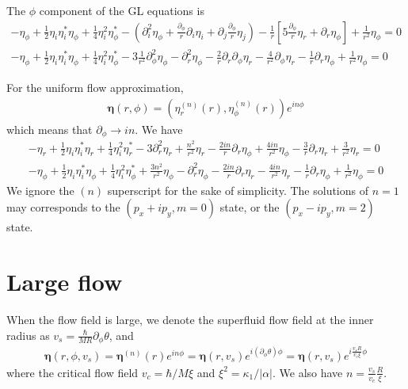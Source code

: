 \documentclass[aps,prl,preprint]{revtex4-2}
\begin{document}
The $\phi$ component of the GL equations is
\begin{align}
    -\eta_\phi+\frac{1}{2}\eta_i\eta_i^*\eta_\phi
    +\frac{1}{4}\eta_i^2\eta_\phi^*
    -\left(\partial_i^2\eta_\phi
    +\frac{\partial_\phi}{r}\partial_i\eta_i
    +\partial_j\frac{\partial_\phi}{r}\eta_j\right)
    -\frac{1}{r}\left[5\frac{\partial_\phi}{r}\eta_r
    +\partial_r\eta_\phi\right]
    +\frac{1}{r^2}\eta_\phi=0\nonumber\\
    -\eta_\phi+\frac{1}{2}\eta_i\eta_i^*\eta_\phi
    +\frac{1}{4}\eta_i^2\eta_\phi^*
    -3\frac{1}{r^2}\partial_\phi^2\eta_\phi
    -\partial_r^2\eta_\phi
    -\frac{2}{r}\partial_r\partial_\phi\eta_r
    -\frac{4}{r^2}\partial_\phi\eta_r
    -\frac{1}{r}\partial_r\eta_\phi
    +\frac{1}{r^2}\eta_\phi=0\nonumber
\end{align}

For the uniform flow approximation,
\begin{align}
    \bm{\eta}(r, \phi) = \left(\eta_r^{(n)}(r), \eta_\phi^{(n)}(r)\right) e^{in\phi}
\end{align}
which means that $\partial_\phi \rightarrow in$. We have
\begin{align}
    -\eta_r+\frac{1}{2}\eta_i\eta_i^*\eta_r
    +\frac{1}{4}\eta_i^2\eta_r^*
    -3\partial_r^2\eta_r + \frac{n^2}{r^2}\eta_r
    -\frac{2in}{r}\partial_r\eta_\phi
    +\frac{4in}{r^2}\eta_\phi
    -\frac{3}{r}\partial_r\eta_r + \frac{3}{r^2}\eta_r=0 \nonumber\\
    -\eta_\phi+\frac{1}{2}\eta_i\eta_i^*\eta_\phi
    +\frac{1}{4}\eta_i^2\eta_\phi^*
    +\frac{3n^2}{r^2}\eta_\phi
    -\partial_r^2\eta_\phi
    -\frac{2in}{r}\partial_r\eta_r
    -\frac{4in}{r^2}\eta_r
    -\frac{1}{r}\partial_r\eta_\phi
    +\frac{1}{r^2}\eta_\phi=0\nonumber
\end{align}
We ignore the $(n)$ superscript for the sake of simplicity.
The solutions of $n=1$ may corresponds to the
$(p_x + ip_y, m=0)$ state, or the $(p_x - ip_y, m=2)$ state.

\section{Large flow}

When the flow field is large, we denote the superfluid flow field at the inner radius as
$v_s = \frac{\hbar}{MR}\partial_\phi\theta$, and
\begin{align}
    \bm{\eta}(r, \phi, v_s)
    = \bm{\eta}^{(n)}(r) e^{in\phi} = \bm{\eta}(r, v_s)e^{i(\partial_\phi\theta)\phi}
    = \bm{\eta}(r, v_s)e^{i\frac{v_s R}{v_c \xi}\phi}
\end{align}
where the critical flow field $v_c = \hbar/M\xi$ and $\xi^2=\kappa_1/|\alpha|$.
We also have $n=\frac{v_s}{v_c}\frac{R}{\xi}$.
\end{document}
